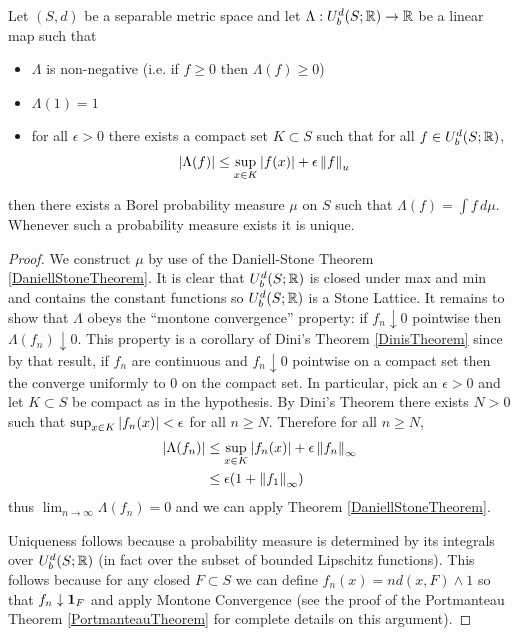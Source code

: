 \begin{lem}\label{StoneDaniellProbability}Let $(S,d)$ be a separable metric space and let $\Lambda :
  U_b^d(S; \mathbb{R}) \to \mathbb{R}$ be a linear map such that 
\begin{itemize}
\item[(i)] $\Lambda$ is non-negative (i.e. if
  $f \geq 0$ then $\Lambda(f) \geq 0$) 
\item[(ii)] $\Lambda(1) = 1$
\item[(iii)] for all $\epsilon > 0$ there exists a compact set $K
  \subset S$ such that for all $f \in U_b^d(S; \mathbb{R})$,
\begin{align*}
\left \vert \Lambda(f) \right \vert &\leq \sup_{x \in K} \left \vert f(x) \right \vert + \epsilon \left \lVert f \right \rVert_u
\end{align*}
\end{itemize}
then there exists a Borel probability measure $\mu$ on $S$ such that
$\Lambda(f) = \int f \, d\mu$.  Whenever such a probability measure
exists it is unique.
\end{lem}
\begin{proof}
We construct $\mu$ by use of the Daniell-Stone Theorem
\ref{DaniellStoneTheorem}.  It is clear that $U_b^d(S; \mathbb{R})$ is
closed under max and min and contains the constant functions so
$U_b^d(S; \mathbb{R})$ is a Stone Lattice.  It remains to show that
$\Lambda$ obeys the ``montone convergence'' property: if $f_n
\downarrow 0$ pointwise then $\Lambda(f_n) \downarrow 0$.  This
property is a corollary of Dini's Theorem \ref{DinisTheorem} since by that result,
if $f_n$ are continuous and $f_n \downarrow 0$ pointwise on a compact
set then the converge uniformly to $0$ on the compact set.  In
particular, pick an $\epsilon > 0$ and let $K \subset S$ be compact
as in the hypothesis.  By Dini's Theorem there exists $N > 0$ such
that $\sup_{x \in K} \left \vert f_n(x) \right \vert < \epsilon$ for all $n \geq N$.  Therefore
for all $n \geq N$,
\begin{align*}
\left \vert \Lambda(f_n) \right \vert &\leq \sup_{x \in K} \left \vert f_n(x) \right \vert + \epsilon
\left \lVert f_n \right \rVert_\infty \\
&\leq \epsilon(1 + \left \lVert f_1 \right \rVert_\infty)
\end{align*}
thus $\lim_{n \to \infty} \Lambda(f_n) = 0$ and we can apply Theorem \ref{DaniellStoneTheorem}. 

Uniqueness follows because a probability measure is determined by its
integrals over $U_b^d(S;\mathbb{R})$ (in fact over the subset of bounded
Lipschitz functions).  This follows because for any closed $F \subset
S$ we can define $f_n(x) = n d(x, F) \wedge 1$ so that $f_n
\downarrow \textbf{1}_{F}$ and apply Montone Convergence (see the
proof of the Portmanteau Theorem \ref{PortmanteauTheorem} for complete
details on this argument).
\end{proof}

